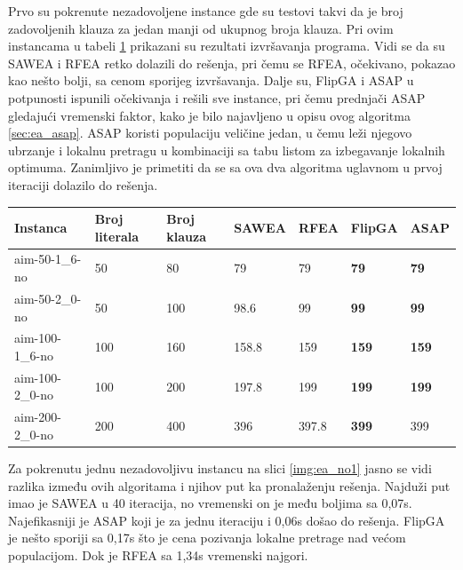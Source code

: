 \documentclass[a4paper]{article}
\begin{document}
Prvo su pokrenute nezadovoljene instance gde su testovi takvi da je broj zadovoljenih klauza
za jedan manji od ukupnog broja klauza. Pri ovim instancama u tabeli \ref{tab:ea_UNSAT}
prikazani su rezultati izvršavanja programa. Vidi se da su SAWEA i RFEA retko dolazili
do rešenja, pri čemu se RFEA, očekivano, pokazao kao nešto bolji, sa cenom sporijeg
izvršavanja. Dalje su, FlipGA i ASAP u potpunosti ispunili očekivanja i rešili sve instance,
pri čemu prednjači ASAP gledajući vremenski faktor, kako je bilo najavljeno u opisu ovog 
algoritma \ref{sec:ea_asap}. ASAP koristi populaciju veličine jedan, u čemu leži njegovo
ubrzanje i lokalnu pretragu u kombinaciji sa tabu listom za izbegavanje lokalnih optimuma.
Zanimljivo je primetiti da se sa ova dva algoritma uglavnom u prvoj iteraciji dolazilo do 
rešenja.\\

\begin{table}[h!]
\centering
{}\label{tab:ea_UNSAT}
\begin{tabular}{ |p{2.5cm}|p{1.4cm}|p{1.4cm}||p{1.6cm}|p{1.6cm}|p{1.6cm}|p{1.6cm}|} 
 \hline
 Instanca & Broj \break literala & Broj \break klauza & SAWEA & RFEA & FlipGA & ASAP \\ 
 \hline
 aim-50-1\_6-no & 50 & 80 & 79 & 79 & \textbf{79} & \textbf{79} \\
 aim-50-2\_0-no & 50 & 100 & 98.6 &  99 & \textbf{99} & \textbf{99} \\
 aim-100-1\_6-no & 100 & 160 & 158.8 & 159 & \textbf{159} & \textbf{159} \\
 aim-100-2\_0-no & 100 & 200 & 197.8 & 199 & \textbf{199} & \textbf{199} \\
 aim-200-2\_0-no & 200 & 400 & 396 & 397.8 & \textbf{399} & 399 \\ 
 \hline
\end{tabular}
\end{table}


Za pokrenutu jednu nezadovoljivu instancu na slici \ref{img:ea_no1} 
jasno se vidi razlika između ovih algoritama i njihov put ka pronalaženju rešenja.
Najduži put imao je SAWEA u 40 iteracija, no vremenski on je među boljima sa 0,07s.
Najefikasniji je ASAP koji je za jednu iteraciju i 0,06s došao do rešenja.
FlipGA je nešto sporiji sa 0,17s što je cena pozivanja lokalne pretrage nad većom
populacijom. Dok je RFEA sa 1,34s vremenski najgori.\\
\end{document}
